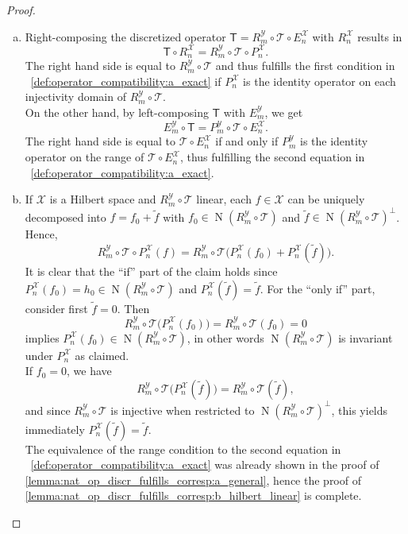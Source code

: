 \documentclass[a4paper]{paper}
\newcommand{\VecSpace}[1]{\mathscr{#1}}
\newcommand{\Op}[1]{\mathcal{#1}}
\newcommand{\DiscOp}[1]{\mathsf{#1}}
\newcommand*{\EXT}[2]{\ensuremath{E_{#1}^{#2}}}
\newcommand*{\REST}[2]{\ensuremath{R_{#1}^{#2}}}
\newcommand*{\PROJ}[2]{\ensuremath{P_{#1}^{#2}}}
\newcommand*{\RnX}{\ensuremath{\REST{n}{\VecSpace{X}}}}
\newcommand*{\RmY}{\ensuremath{\REST{m}{\VecSpace{Y}}}}
\newcommand*{\EnX}{\ensuremath{\EXT{n}{\VecSpace{X}}}}
\newcommand*{\EmY}{\ensuremath{\EXT{m}{\VecSpace{Y}}}}
\newcommand*{\PnX}{\ensuremath{\PROJ{n}{\VecSpace{X}}}}
\newcommand*{\PmY}{\ensuremath{\PROJ{m}{\VecSpace{Y}}}}
\DeclareMathOperator{\nullspace}{N}
\begin{document}
\begin{proof}
 \begin{enumerate}[a)]
  \item Right-composing the discretized operator $\DiscOp{T} = \RmY \circ \Op{T} \circ \EnX$ with $\RnX$ results in
  \begin{equation*}
   \DiscOp{T} \circ \RnX = \RmY \circ \Op{T} \circ \PnX.
  \end{equation*}
  The right hand side is equal to $\RmY \circ \Op{T}$ and thus fulfills the first condition in 
  ~\eqref{def:operator_compatibility:a_exact} if $\PnX$ is the identity operator on each
  injectivity domain of $\RmY \circ \Op{T}$.\\[1ex]
  On the other hand, by left-composing $\DiscOp{T}$ with $\EmY$, we get
  \begin{equation*}
   \EmY \circ \DiscOp{T} = \PmY \circ \Op{T} \circ \EnX.
  \end{equation*}
  The right hand side is equal to $\Op{T} \circ \EnX$ if and only if $\PmY$ is the identity operator on the range of $\Op{T} \circ \EnX$, 
  thus fulfilling the second equation in ~\eqref{def:operator_compatibility:a_exact}.

  \item If $\VecSpace{X}$ is a Hilbert space and $\RmY \circ \Op{T}$ linear, each $f \in \VecSpace{X}$ can be uniquely decomposed into 
  $f = f_0 + \tilde f$ with  $f_0 \in \nullspace(\RmY \circ \Op{T})$ and $\tilde f \in \nullspace(\RmY \circ \Op{T})^\perp$. Hence,
  \begin{equation*}
   \RmY \circ \Op{T} \circ \PnX (f) = \RmY \circ \Op{T} \big( \PnX (f_0) + \PnX(\tilde f) \big).
  \end{equation*}
  It is clear that the ``if'' part of the claim holds since $\PnX (f_0) = h_0 \in \nullspace(\RmY \circ \Op{T})$ and 
  $\PnX(\tilde f) = \tilde f$. For the ``only if'' part, consider first $\tilde f = 0$. Then 
  \begin{equation*}
   \RmY \circ \Op{T} \big( \PnX (f_0) \big) = \RmY \circ \Op{T} (f_0) = 0
  \end{equation*}
  implies $\PnX (f_0) \in \nullspace(\RmY \circ \Op{T})$, in other words $\nullspace(\RmY \circ \Op{T})$ is invariant under $\PnX$ as 
  claimed.\\
  If $f_0 = 0$, we have
  \begin{equation*}
   \RmY \circ \Op{T} \big( \PnX (\tilde f) \big) = \RmY \circ \Op{T} (\tilde f),
  \end{equation*}
  and since $\RmY \circ \Op{T}$ is injective when restricted to $\nullspace(\RmY \circ \Op{T})^\perp$, this yields immediately 
  $\PnX (\tilde f) = \tilde f$.\\
  The equivalence of the range condition to the second equation in 
  ~\eqref{def:operator_compatibility:a_exact} was already shown in the proof of 
  \eqref{lemma:nat_op_discr_fulfills_corresp:a_general}, hence the proof of \eqref{lemma:nat_op_discr_fulfills_corresp:b_hilbert_linear} is 
  complete.
  

\end{enumerate}
\end{proof}
\end{document}
